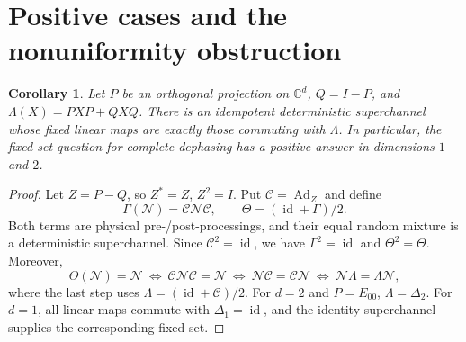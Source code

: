 \documentclass[11pt]{article}
\newtheorem{corollary}[theorem]{Corollary}
\newcommand{\Ad}{\operatorname{Ad}}
\newcommand{\id}{\operatorname{id}}
\begin{document}
\section{Positive cases and the nonuniformity obstruction}
\begin{corollary}\label{prop:qubit}
Let $P$ be an orthogonal projection on $\mathbb C^d$,
$Q=I-P$, and $\Lambda(X)=PXP+QXQ$.
There is an idempotent deterministic superchannel whose fixed linear maps
are exactly those commuting with $\Lambda$.
In particular, the fixed-set question for complete dephasing has a positive
answer in dimensions $1$ and $2$.
\end{corollary}
\begin{proof}
Let $Z=P-Q$, so $Z^*=Z$, $Z^2=I$. Put $\mathcal C=\Ad_Z$ and define
\[
 \Gamma(\mathcal N)=\mathcal C\mathcal N\mathcal C,
 \qquad \Theta=(\id+\Gamma)/2.
\]
Both terms are physical pre-/post-processings, and their equal random
mixture is a deterministic superchannel. Since $\mathcal C^2=\id$,
we have $\Gamma^2=\id$ and $\Theta^2=\Theta$. Moreover,
\[
 \Theta(\mathcal N)=\mathcal N
 \ \Longleftrightarrow\ \mathcal C\mathcal N\mathcal C=\mathcal N
 \ \Longleftrightarrow\ \mathcal N\mathcal C=\mathcal C\mathcal N
 \ \Longleftrightarrow\ \mathcal N\Lambda=\Lambda\mathcal N,
\]
where the last step uses $\Lambda=(\id+\mathcal C)/2$.
For $d=2$ and $P=E_{00}$, $\Lambda=\Delta_2$.
For $d=1$, all linear maps commute with $\Delta_1=\id$, and the identity
superchannel supplies the corresponding fixed set.
\end{proof}
\end{document}
